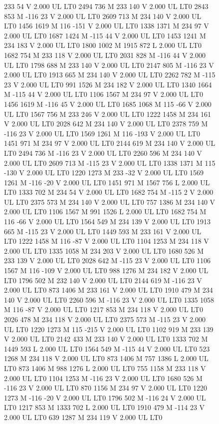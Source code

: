 \documentclass{LMCS}
\begin{document}
\begin{figure}[!tbp]
\begin{minipage}[b]{.47\linewidth}
{{{233 54 V
2.000 UL
LT0
2494 736 M
233 140 V
2.000 UL
LT0
2843 853 M
-116 23 V
2.000 UL
LT0
2609 713 M
234 140 V
2.000 UL
LT0
1456 1619 M
116 -151 V
2.000 UL
LT0
1338 1371 M
234 97 V
2.000 UL
LT0
1687 1424 M
-115 44 V
2.000 UL
LT0
1453 1241 M
234 183 V
2.000 UL
LT0
1800 1002 M
1915 872 L
2.000 UL
LT0
1682 754 M
233 118 V
2.000 UL
LT0
2031 828 M
-116 44 V
2.000 UL
LT0
1798 688 M
233 140 V
2.000 UL
LT0
2147 805 M
-116 23 V
2.000 UL
LT0
1913 665 M
234 140 V
2.000 UL
LT0
2262 782 M
-115 23 V
2.000 UL
LT0
991 1526 M
234 182 V
2.000 UL
LT0
1340 1664 M
-115 44 V
2.000 UL
LT0
1106 1567 M
234 97 V
2.000 UL
LT0
1456 1619 M
-116 45 V
2.000 UL
LT0
1685 1068 M
115 -66 V
2.000 UL
LT0
1567 756 M
233 246 V
2.000 UL
LT0
1222 1458 M
234 161 V
2.000 UL
LT0
2028 642 M
234 140 V
2.000 UL
LT0
2378 759 M
-116 23 V
2.000 UL
LT0
1569 1261 M
116 -193 V
2.000 UL
LT0
1451 971 M
234 97 V
2.000 UL
LT0
2144 619 M
234 140 V
2.000 UL
LT0
2494 736 M
-116 23 V
2.000 UL
LT0
2260 596 M
234 140 V
2.000 UL
LT0
2609 713 M
-115 23 V
2.000 UL
LT0
1338 1371 M
115 -130 V
2.000 UL
LT0
1220 1273 M
233 -32 V
2.000 UL
LT0
1569 1261 M
-116 -20 V
2.000 UL
LT0
1451 971 M
1567 756 L
2.000 UL
LT0
1333 702 M
234 54 V
2.000 UL
LT0
1682 754 M
-115 2 V
2.000 UL
LT0
2375 573 M
234 140 V
2.000 UL
LT0
757 1386 M
234 140 V
2.000 UL
LT0
1106 1567 M
991 1526 L
2.000 UL
LT0
1682 754 M
116 -66 V
2.000 UL
LT0
1564 549 M
234 139 V
2.000 UL
LT0
1913 665 M
-115 23 V
2.000 UL
LT0
1449 593 M
233 161 V
2.000 UL
LT0
1222 1458 M
116 -87 V
2.000 UL
LT0
1104 1253 M
234 118 V
2.000 UL
LT0
1335 1058 M
234 203 V
2.000 UL
LT0
1680 526 M
233 139 V
2.000 UL
LT0
2028 642 M
-115 23 V
2.000 UL
LT0
1106 1567 M
116 -109 V
2.000 UL
LT0
988 1276 M
234 182 V
2.000 UL
LT0
1796 502 M
232 140 V
2.000 UL
LT0
2144 619 M
-116 23 V
2.000 UL
LT0
873 1406 M
233 161 V
2.000 UL
LT0
1910 479 M
234 140 V
2.000 UL
LT0
2260 596 M
-116 23 V
2.000 UL
LT0
1335 1058 M
116 -87 V
2.000 UL
LT0
1217 853 M
234 118 V
2.000 UL
LT0
2026 478 M
234 118 V
2.000 UL
LT0
2375 573 M
-115 23 V
2.000 UL
LT0
1220 1273 M
115 -215 V
2.000 UL
LT0
1102 919 M
233 139 V
2.000 UL
LT0
2142 433 M
233 140 V
2.000 UL
LT0
1333 702 M
1449 593 L
2.000 UL
LT0
1564 549 M
-115 44 V
2.000 UL
LT0
523 1268 M
234 118 V
2.000 UL
LT0
873 1406 M
757 1386 L
2.000 UL
LT0
873 1406 M
988 1276 L
2.000 UL
LT0
755 1158 M
233 118 V
2.000 UL
LT0
1104 1253 M
-116 23 V
2.000 UL
LT0
1680 526 M
-116 23 V
2.000 UL
LT0
870 1156 M
234 97 V
2.000 UL
LT0
1220 1273 M
-116 -20 V
2.000 UL
LT0
1796 502 M
-116 24 V
2.000 UL
LT0
1217 853 M
1333 702 L
2.000 UL
LT0
1910 479 M
-114 23 V
2.000 UL
LT0
639 1287 M
234 119 V
2.000 UL
LT0
}}}
\end{minipage}
\end{figure}
\end{document}
